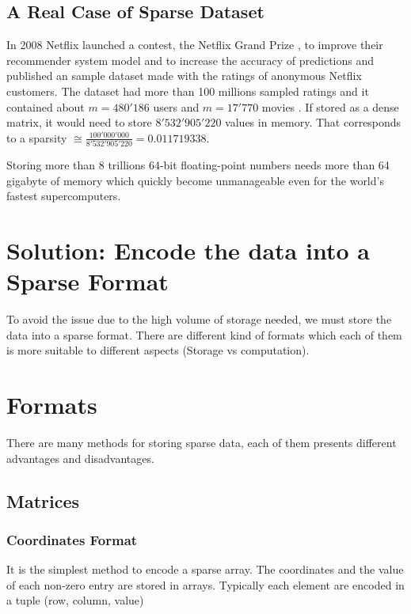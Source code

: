 \subsection{A Real Case of Sparse Dataset}
In 2008 Netflix launched a contest, the Netflix Grand Prize \cite{netflixgrandprize}, to improve their recommender system model and to increase the accuracy of predictions and published an sample dataset made with the ratings of anonymous Netflix customers. The dataset had more than 100 millions sampled ratings and it contained about $m=480'186$ users and $m=17'770$ movies \cite{Koren091the}. If stored as a dense matrix, it would need to store $8'532'905'220$ values in memory. That corresponds to a sparsity $\cong \frac{100'000'000}{8'532'905'220} = 0.011719338$.

Storing more than 8 trillions 64-bit floating-point numbers needs more than 64 gigabyte of memory which quickly become unmanageable even for the world's fastest supercomputers. 

\section{Solution: Encode the data into a Sparse Format}

To avoid the issue due to the high volume of storage needed, we must store the data into a sparse format. There are different kind of formats which each of them is more suitable to different aspects (Storage vs computation).



\section{Formats}

There are many methods for storing sparse data, each of them presents different advantages and disadvantages.

\subsection{Matrices}
\subsubsection{Coordinates Format}

It is the simplest method to encode a sparse array. The coordinates and the value of each non-zero entry are stored in arrays.
Typically each element are encoded in a tuple (row, column, value)

